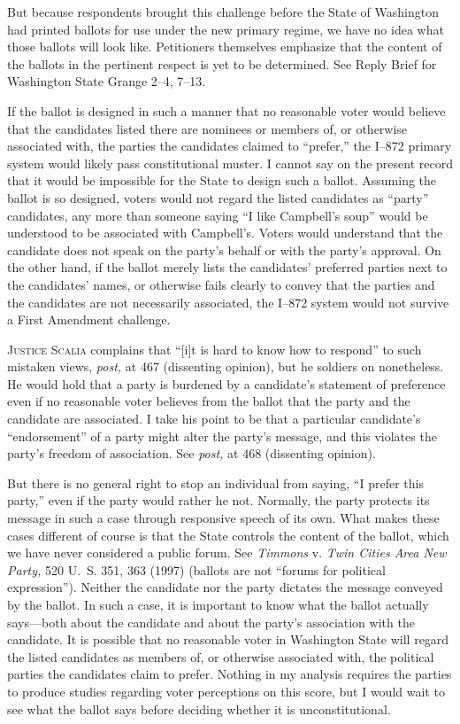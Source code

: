   But because respondents brought this challenge before the State of
Washington had printed ballots for use under the new primary regime, we
have no idea what those ballots will look like. Petitioners themselves
emphasize that the content of the ballots in the pertinent respect is
yet to be determined. See Reply Brief for Washington State Grange
2--4, 7--13.

  If the ballot is designed in such a manner that no reasonable
voter would believe that the candidates listed there are nominees or
members of, or otherwise associated with, the parties the candidates
claimed to ``prefer,'' the I--872 primary system would likely pass
constitutional muster. I cannot say on the present record that it
would be impossible for \newpage  the State to design such a ballot.
Assuming the ballot is so designed, voters would not regard the listed
candidates as ``party'' candidates, any more than someone saying ``I
like Campbell's soup'' would be understood to be associated with
Campbell's. Voters would understand that the candidate does not speak
on the party's behalf or with the party's approval. On the other
hand, if the ballot merely lists the candidates' preferred parties
next to the candidates' names, or otherwise fails clearly to convey
that the parties and the candidates are not necessarily associated, the
I--872 system would not survive a First Amendment challenge.

  \textsc{Justice Scalia} complains that ``[i]t is hard to know how to
respond'' to such mistaken views, \emph{post,} at 467 (dissenting
opinion), but he soldiers on nonetheless. He would hold that a
party is burdened by a candidate's statement of preference even if
no reasonable voter believes from the ballot that the party and the
candidate are associated. I take his point to be that a particular
candidate's ``endorsement'' of a party might alter the party's
message, and this violates the party's freedom of association. See
\emph{post,} at 468 (dissenting opinion).

  But there is no general right to stop an individual from saying, ``I
prefer this party,'' even if the party would rather he not. Normally,
the party protects its message in such a case through responsive speech
of its own. What makes these cases different of course is that the State
controls the content of the ballot, which we have never considered a
public forum. See \emph{Timmons} v. \emph{Twin Cities Area New Party,}
520 U.~S. 351, 363 (1997) (ballots are not ``forums for political
expression''). Neither the candidate nor the party dictates the
message conveyed by the ballot. In such a case, it is important to know
what the ballot actually says---both about the candidate and about
the party's association with the candidate. It is possible that no
reasonable voter in Washington State will regard the listed candidates
as members of, or otherwise associated with, the political parties the
candidates claim to prefer. Nothing in my analysis requires the \newpage 
parties to produce studies regarding voter perceptions on this score,
but I would wait to see what the ballot says before deciding whether it
is unconstitutional.


